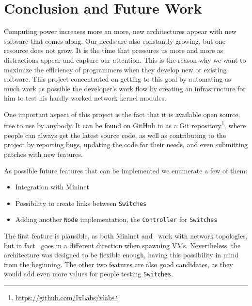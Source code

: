 \chapter{Conclusion and Future Work}
\label{chapter:Chapter 6}

Computing power increases more an more, new architectures appear with new software that comes along.
Our needs are also constantly growing, but one resource does not grow.
It is the time that pressures us more and more as distractions appear and capture our attention.
This is the reason why we want to maximize the efficiency of programmers when they develop new or existing software.
This project concentrated on getting to this goal by automating as much work as possible the developer's work flow by creating an infrastructure for him to test his hardly worked network kernel modules.

One important aspect of this project is the fact that it is available open source, free to use by anybody.
It can be found on GitHub in as a Git repository\footnote{\url{https://github.com/IxLabs/vlab}}, where people can always get the latest source code, as well as contributing to the project by reporting bugs, updating the code for their needs, and even submitting patches with new features.

As possible future features that can be implemented we enumerate a few of them:
\begin{itemize}
  \item Integration with Mininet
  \item Possibility to create links between \texttt{Switches}
  \item Adding another \texttt{Node} implementation, the \texttt{Controller} for \texttt{Switches}
\end{itemize}

The first feature is plausible, as both Mininet and \project\ work with network topologies, but in fact \project\ goes in a different direction when spawning VMs.
Nevertheless, the architecture was designed to be flexible enough, having this possibility in mind from the beginning.
The other two features are also good candidates, as they would add even more values for people testing \texttt{Switches}.
